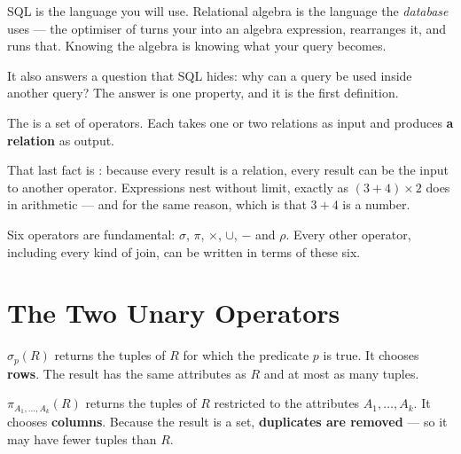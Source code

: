 SQL is the language you will use. Relational algebra is the language the
\emph{database} uses --- the optimiser of  turns your
 into an algebra expression, rearranges it, and runs that.
Knowing the algebra is knowing what your query becomes.

It also answers a question that SQL hides: why can a query be used inside
another query? The answer is one property, and it is the first definition.

\begin{definitionbox}
The  is a set of operators. Each takes one or two
relations as input and produces \textbf{a relation} as output.

\smallskip
That last fact is : because every result is a relation, every
result can be the input to another operator. Expressions nest without limit,
exactly as $(3+4)\times 2$ does in arithmetic --- and for the same reason, which
is that $3+4$ is a number.

\smallskip
Six operators are fundamental: $\sigma$, $\pi$, $\times$, $\cup$, $-$ and
$\rho$. Every other operator, including every kind of join, can be written in
terms of these six.
\end{definitionbox}

\section{The Two Unary Operators}

\begin{definitionbox}
 $\sigma_{p}(R)$ returns the tuples of $R$ for which the
predicate $p$ is true. It chooses \textbf{rows}. The result has the same
attributes as $R$ and at most as many tuples.

\smallskip
{} $\pi_{A_1,\dots,A_k}(R)$ returns the tuples of $R$
restricted to the attributes $A_1,\dots,A_k$. It chooses \textbf{columns}.
Because the result is a set, \textbf{duplicates are removed} --- so it may have
fewer tuples than $R$.
\end{definitionbox}

